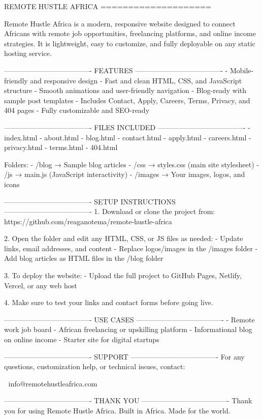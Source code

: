 REMOTE HUSTLE AFRICA
====================

Remote Hustle Africa is a modern, responsive website designed to connect Africans with remote job opportunities, freelancing platforms, and online income strategies. It is lightweight, easy to customize, and fully deployable on any static hosting service.

-------------------------------------
FEATURES
-------------------------------------
- Mobile-friendly and responsive design
- Fast and clean HTML, CSS, and JavaScript structure
- Smooth animations and user-friendly navigation
- Blog-ready with sample post templates
- Includes Contact, Apply, Careers, Terms, Privacy, and 404 pages
- Fully customizable and SEO-ready

-------------------------------------
FILES INCLUDED
-------------------------------------
- index.html
- about.html
- blog.html
- contact.html
- apply.html
- careers.html
- privacy.html
- terms.html
- 404.html

Folders:
- /blog       → Sample blog articles
- /css        → styles.css (main site stylesheet)
- /js         → main.js (JavaScript interactivity)
- /images     → Your images, logos, and icons

-------------------------------------
SETUP INSTRUCTIONS
-------------------------------------
1. Download or clone the project from:
   https://github.com/reaganotema/remote-hustle-africa

2. Open the folder and edit any HTML, CSS, or JS files as needed:
   - Update links, email addresses, and content
   - Replace logos/images in the /images folder
   - Add blog articles as HTML files in the /blog folder

3. To deploy the website:
   - Upload the full project to GitHub Pages, Netlify, Vercel, or any web host

4. Make sure to test your links and contact forms before going live.

-------------------------------------
USE CASES
-------------------------------------
- Remote work job board
- African freelancing or upskilling platform
- Informational blog on online income
- Starter site for digital startups

-------------------------------------
SUPPORT
-------------------------------------
For any questions, customization help, or technical issues, contact:

📧 info@remotehustleafrica.com

-------------------------------------
THANK YOU
-------------------------------------
Thank you for using Remote Hustle Africa.  
Built in Africa. Made for the world.
